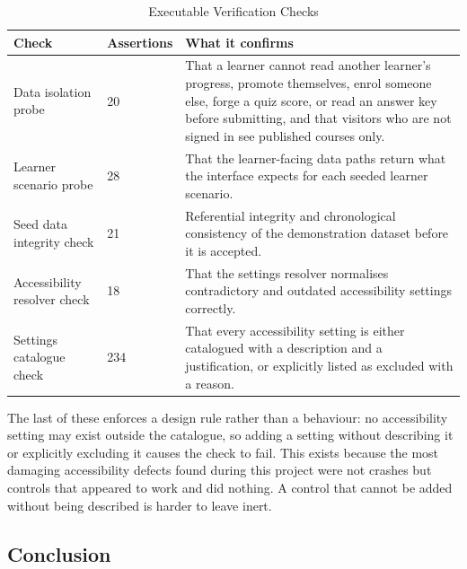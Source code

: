 \documentclass[12pt, oneside]{article} %
\newcommand{\tabbreak}{\hyphenpenalty=200\exhyphenpenalty=200\tolerance=4000\hbadness=10000\hspace{0pt}}
\begin{document}
\begin{table}[H]
\caption{Executable Verification Checks}
\label{tab:verification}
\vspace{-4mm}
\begin{center}
\renewcommand{\arraystretch}{1.2}
\footnotesize
\begin{tabular}{|>{\raggedright\arraybackslash\tabbreak}p{3.82cm}|>{\raggedright\arraybackslash\tabbreak}p{2.0cm}|>{\raggedright\arraybackslash\tabbreak}p{7.54cm}|}
\hline
\textbf{Check} & \textbf{Assertions} & \textbf{What it confirms} \\
\hline \hline
Data isolation probe & 20 & That a learner cannot read another learner's progress, promote themselves, enrol someone else, forge a quiz score, or read an answer key before submitting, and that visitors who are not signed in see published courses only. \\ \hline
Learner scenario probe & 28 & That the learner-facing data paths return what the interface expects for each seeded learner scenario. \\ \hline
Seed data integrity check & 21 & Referential integrity and chronological consistency of the demonstration dataset before it is accepted. \\ \hline
Accessibility resolver check & 18 & That the settings resolver normalises contradictory and outdated accessibility settings correctly. \\ \hline
Settings catalogue check & 234 & That every accessibility setting is either catalogued with a description and a justification, or explicitly listed as excluded with a reason. \\ \hline
\end{tabular}
\end{center}
\end{table}

The last of these enforces a design rule rather than a behaviour: no accessibility setting may exist outside the catalogue, so adding a setting without describing it or explicitly excluding it causes the check to fail. This exists because the most damaging accessibility defects found during this project were not crashes but controls that appeared to work and did nothing. A control that cannot be added without being described is harder to leave inert.

\subsection{Conclusion}
\end{document}
